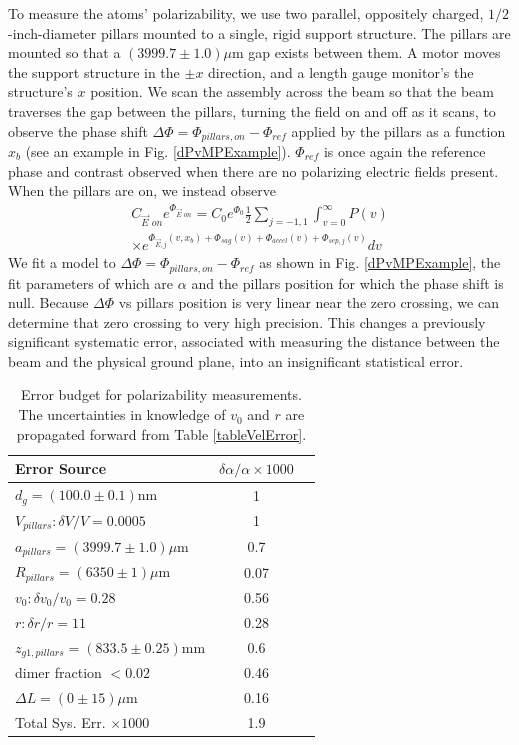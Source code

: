 \documentclass[twocolumn,prl,showpacs,superscriptaddress]{revtex4-1}   %
\newcommand{\figref}[1]{Fig. \ref{#1}}
\newcommand{\sigv}{0.28}
\newcommand{\sigr}{11}
\begin{document}
To measure the atoms' polarizability, we use two parallel, oppositely charged, $1/2$-inch-diameter pillars mounted to a single, rigid support structure. The pillars are mounted so that a $(3999.7 \pm 1.0)\mu$m gap exists between them. A motor moves the support structure in the $\pm x$ direction, and a length gauge monitor's the structure's $x$ position. We scan the assembly across the beam so that the beam traverses the gap between the pillars, turning the field on and off as it scans, to observe the phase shift $\Delta\Phi = \Phi_{pillars,on} - \Phi_{ref}$ applied by the pillars as a function $x_b$ (see an example in \figref{dPvMPExample}). $\Phi_{ref}$ is once again the reference phase and contrast observed when there are no polarizing electric fields present.
When the pillars are on, we instead observe
\begin{align}
	C_{\vec{E}\textit{ on}}e^{\Phi_{\vec{E}\textit{ on}}} = 
		C_0e^{\Phi_0}		
		\frac{1}{2} \sum_{j=-1,1}
		\int_{v=0}^{\infty} P(v) \nonumber \\ \times
		e^{
			\Phi_{\vec{E},j}(v,x_b) + 
			\Phi_{sag}(v) + \Phi_{accel}(v) + \Phi_{sep,j}(v)
		} 
		dv
	\label{CPPolesEOn}
\end{align}
We fit a model to $\Delta\Phi = \Phi_{pillars,on} - \Phi_{ref}$ as shown in \figref{dPvMPExample}, the fit parameters of which are $\alpha$ and the pillars position for which the phase shift is null. Because $\Delta\Phi$ vs pillars position is very linear near the zero crossing, we can determine that zero crossing to very high precision. 
This changes a previously significant systematic error, associated with measuring the distance between the beam and the physical ground plane, into an insignificant statistical error.

\begingroup
\begin{table}
\caption{\label{tablePolError}Error budget for polarizability measurements. The uncertainties in knowledge of $v_0$ and $r$ are propagated forward from Table \ref{tableVelError}.}
\begin{center}
\begin{tabular}{l c c}
\hline\hline
Error Source & $\delta\alpha/\alpha \times 1000$ \\
\hline
$d_g = (100.0 \pm 0.1) \mathrm{nm}$ 		& 1 \\
$V_{pillars}: \delta V/V = 0.0005$ 		& 1 \\
$a_{pillars} = (3999.7 \pm 1.0) \mu\mathrm{m}$ 		& 0.7 \\
$R_{pillars} = (6350 \pm 1) \mu\mathrm{m}$ 		& 0.07 \\
$v_0: \delta v_0/v_0 = \sigv$		& 0.56 \\
$r: \delta r/r = \sigr$ 		& 0.28 \\
$z_{g1,pillars} = (833.5 \pm 0.25) \mathrm{mm}$ 		& 0.6 \\
dimer fraction $ < 0.02$ 		& 0.46 \\
$\Delta L = (0 \pm 15) \mu\mathrm{m}$ 		& 0.16 \\
\hline
Total Sys. Err. $\times 1000$ & 1.9 \\
\hline\hline
\end{tabular}
\end{center}
\end{table}
\endgroup
\end{document}
